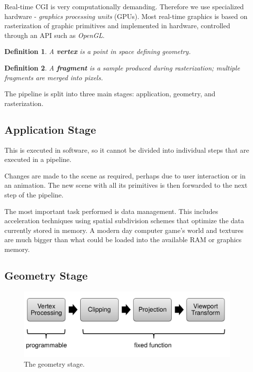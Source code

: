 \documentclass[11pt]{article}
\newtheorem{defn}{Definition}
\begin{document}
Real-time CGI is very computationally demanding.
Therefore we use specialized hardware - \textit{graphics processing units} (GPUs).
Most real-time graphics is based on rasterization of graphic primitives and implemented in hardware, controlled through an API such as \textit{OpenGL}.

\begin{defn}
  A \textbf{vertex} is a point in space defining geometry.
\end{defn}

\begin{defn}
  A \textbf{fragment} is a sample produced during rasterization; multiple fragments are merged into pixels.
\end{defn}

The pipeline is split into three main stages: application, geometry, and rasterization.

\subsection{Application Stage}
This is executed in software, so it cannot be divided into individual steps that are executed in a pipeline.

Changes are made to the scene as required, perhaps due to user interaction or in an animation.
The new scene with all its primitives is then forwarded to the next step of the pipeline.

The most important task performed is data management.
This includes acceleration techniques using spatial subdivision schemes that optimize the data currently stored in memory.
A modern day computer game's world and textures are much bigger than what could be loaded into the available RAM or graphics memory.

\subsection{Geometry Stage}
\begin{figure}[htb!]
  \centering
  \caption{The geometry stage.}
  \includegraphics[scale=0.3]{geometrystage}
\end{figure}
\end{document}
